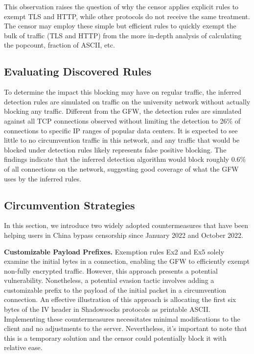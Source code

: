 This observation raises the question of why the censor applies explicit rules to exempt TLS and HTTP, while other protocols do not receive the same treatment. The censor may employ these simple but efficient rules to quickly exempt the bulk of traffic (TLS and HTTP) from the more in-depth analysis of calculating the popcount, fraction of ASCII, etc.

\subsection{Evaluating Discovered Rules}
To determine the impact this blocking may have on regular traffic, the inferred detection rules are simulated on traffic on the university network without actually blocking any traffic. Different from the GFW, the detection rules are simulated against all TCP connections observed without limiting the detection to 26\% of connections to specific IP ranges of popular data centers. It is expected to see little to no circumvention traffic in this network, and any traffic that would be blocked under detection rules likely represents false positive blocking. The findings indicate that the inferred detection algorithm would block roughly 0.6\% of all connections on the network, suggesting good coverage of what the GFW uses by the inferred rules.

\subsection{Circumvention Strategies}
In this section, we introduce two widely adopted countermeasures that have been helping users in China bypass censorship since January 2022 and October 2022.

\textbf{Customizable Payload Prefixes.} Exemption rules Ex2 and Ex5 solely examine the initial bytes in a connection, enabling the GFW to efficiently exempt non-fully encrypted traffic. However, this approach presents a potential vulnerability. Nonetheless, a potential evasion tactic involves adding a customizable prefix to the payload of the initial packet in a circumvention connection. An effective illustration of this approach is allocating the first six bytes of the IV header in Shadowsocks protocols as printable ASCII. Implementing these countermeasures necessitates minimal modifications to the client and no adjustments to the server. Nevertheless, it's important to note that this is a temporary solution and the censor could potentially block it with relative ease.

